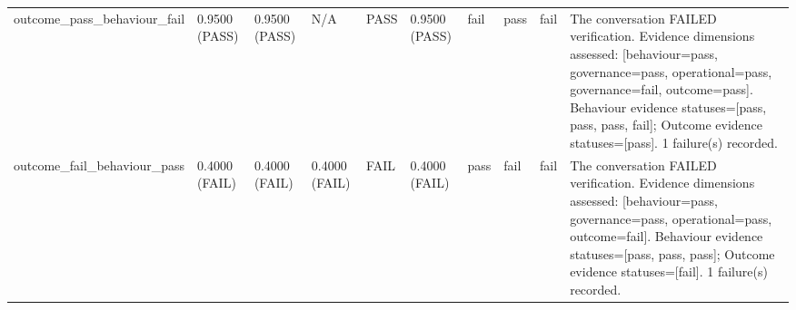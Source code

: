 \begin{table}[t]
\begin{tabular}{llllllllll}
outcome\_pass\_behaviour\_fail & 0.9500 (PASS) & 0.9500 (PASS) & N/A & PASS & 0.9500 (PASS) & fail & pass & fail & The conversation FAILED verification.  Evidence dimensions assessed: [behaviour=pass, governance=pass, operational=pass, governance=fail, outcome=pass].  Behaviour evidence statuses=[pass, pass, pass, fail]; Outcome evidence statuses=[pass].  1 failure(s) recorded. \\
outcome\_fail\_behaviour\_pass & 0.4000 (FAIL) & 0.4000 (FAIL) & 0.4000 (FAIL) & FAIL & 0.4000 (FAIL) & pass & fail & fail & The conversation FAILED verification.  Evidence dimensions assessed: [behaviour=pass, governance=pass, operational=pass, outcome=fail].  Behaviour evidence statuses=[pass, pass, pass]; Outcome evidence statuses=[fail].  1 failure(s) recorded. \\
\bottomrule
\end{tabular}
\end{table}
